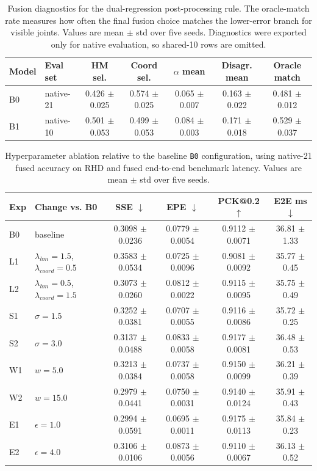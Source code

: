 \documentclass[10pt,letterpaper,twocolumn]{article}
\begin{document}
\begin{table}[H]
\centering
\footnotesize
\caption{Fusion diagnostics for the dual-regression post-processing rule. The oracle-match rate measures how often the final fusion choice matches the lower-error branch for visible joints. Values are mean $\pm$ std over five seeds. Diagnostics were exported only for native evaluation, so shared-10 rows are omitted.}
\label{tab:fusion_diagnostics}
\begin{tabular}{llccccc}
\toprule
Model & Eval set & HM sel. & Coord sel. & $\alpha$ mean & Disagr. mean & Oracle match \\
\midrule
B0 & native-21 & 0.426 $\pm$ 0.025 & 0.574 $\pm$ 0.025 & 0.065 $\pm$ 0.007 & 0.163 $\pm$ 0.022 & 0.481 $\pm$ 0.012 \\
B1 & native-10 & 0.501 $\pm$ 0.053 & 0.499 $\pm$ 0.053 & 0.084 $\pm$ 0.003 & 0.171 $\pm$ 0.018 & 0.529 $\pm$ 0.037 \\
\bottomrule
\end{tabular}
\end{table}

\begin{table}[H]
\centering
\footnotesize
\caption{Hyperparameter ablation relative to the baseline \texttt{B0} configuration, using native-21 fused accuracy on RHD and fused end-to-end benchmark latency. Values are mean $\pm$ std over five seeds.}
\label{tab:hyper_ablation}
\begin{tabular}{llcccc}
\toprule
Exp & Change vs. B0 & SSE $\downarrow$ & EPE $\downarrow$ & PCK@0.2 $\uparrow$ & E2E ms $\downarrow$ \\
\midrule
B0 & baseline & 0.3098 $\pm$ 0.0236 & 0.0779 $\pm$ 0.0054 & 0.9112 $\pm$ 0.0071 & 36.81 $\pm$ 1.33 \\
L1 & $\lambda_{hm}=1.5$, $\lambda_{coord}=0.5$ & 0.3583 $\pm$ 0.0534 & 0.0725 $\pm$ 0.0096 & 0.9081 $\pm$ 0.0092 & 35.77 $\pm$ 0.45 \\
L2 & $\lambda_{hm}=0.5$, $\lambda_{coord}=1.5$ & 0.3073 $\pm$ 0.0260 & 0.0812 $\pm$ 0.0022 & 0.9115 $\pm$ 0.0095 & 35.75 $\pm$ 0.49 \\
S1 & $\sigma=1.5$ & 0.3252 $\pm$ 0.0381 & 0.0707 $\pm$ 0.0055 & 0.9116 $\pm$ 0.0086 & 35.72 $\pm$ 0.25 \\
S2 & $\sigma=3.0$ & 0.3137 $\pm$ 0.0488 & 0.0833 $\pm$ 0.0058 & 0.9177 $\pm$ 0.0081 & 36.48 $\pm$ 0.53 \\
W1 & $w=5.0$ & 0.3213 $\pm$ 0.0384 & 0.0737 $\pm$ 0.0058 & 0.9150 $\pm$ 0.0099 & 36.21 $\pm$ 0.39 \\
W2 & $w=15.0$ & 0.2979 $\pm$ 0.0441 & 0.0750 $\pm$ 0.0031 & 0.9140 $\pm$ 0.0124 & 35.91 $\pm$ 0.43 \\
E1 & $\epsilon=1.0$ & 0.2994 $\pm$ 0.0591 & 0.0695 $\pm$ 0.0011 & 0.9175 $\pm$ 0.0113 & 35.84 $\pm$ 0.23 \\
E2 & $\epsilon=4.0$ & 0.3106 $\pm$ 0.0106 & 0.0873 $\pm$ 0.0056 & 0.9110 $\pm$ 0.0067 & 36.13 $\pm$ 0.52 \\
\bottomrule
\end{tabular}
\end{table}
\end{document}
